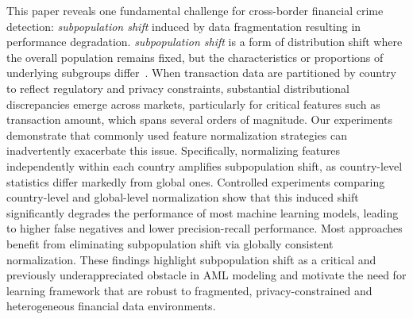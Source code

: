This paper reveals one fundamental challenge for cross-border financial crime detection: \textit{subpopulation shift} induced by data fragmentation resulting in performance degradation. \textit{subpopulation shift} is a form of distribution shift where the overall population remains fixed, but the characteristics or proportions of underlying subgroups differ~\parencite{koh2021wilds}. When transaction data are partitioned by country to reflect regulatory and privacy constraints, substantial distributional discrepancies emerge across markets, particularly for critical features such as transaction amount, which spans several orders of magnitude. Our experiments demonstrate that commonly used feature normalization strategies can inadvertently exacerbate this issue. Specifically, normalizing features independently within each country amplifies subpopulation shift, as country-level statistics differ markedly from global ones. Controlled experiments comparing country-level and global-level normalization show that this induced shift significantly degrades the performance of most machine learning models, leading to higher false negatives and lower precision-recall performance. Most approaches benefit from eliminating subpopulation shift via globally consistent normalization. These findings highlight subpopulation shift as a critical and previously underappreciated obstacle in AML modeling and motivate the need for learning framework that are robust to fragmented, privacy-constrained and heterogeneous financial data environments.


